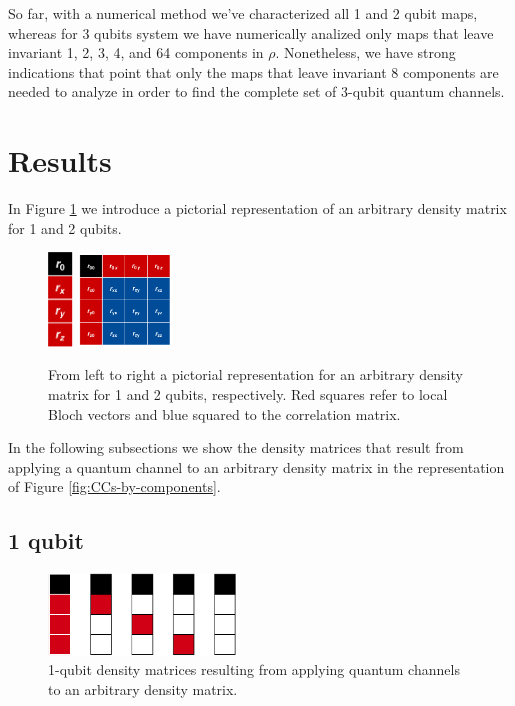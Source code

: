 \documentclass[11pt,dvipsnames]{article} %
\begin{document}
So far, with a numerical method we've characterized all 1 and 2 qubit maps, 
whereas for 3 qubits system we have numerically analized only maps that leave 
invariant 1, 2, 3, 4, and 64 components in $\rho$. Nonetheless, we have strong
indications that point that only the maps that leave invariant 8 components are 
needed to analyze in order to find the complete set of 3-qubit quantum 
channels.
\section*{Results} %
In Figure \ref{fig:pictorial-rep-rho} we introduce a pictorial representation 
of an arbitrary density matrix for 1 and 2 qubits.
\begin{figure} %
	\centering
	\hfill \hfill
	\includegraphics[height=2.5cm]
	{img/tablero-1q}
	\hfill
	\includegraphics[width=2.5cm]
	{img/rho2q(2)}
	\hfill \hfill
	\caption{From left to right a pictorial representation for an arbitrary
	density matrix for 1 and 2 qubits, respectively. Red squares refer to local
	Bloch vectors and blue squared to the correlation matrix.}
	\label{fig:pictorial-rep-rho}
\end{figure} %
In the following subsections we show the density matrices that result from
applying a quantum channel to an arbitrary density matrix in the representation
of Figure \ref{fig:CCs-by-components}.

\subsection*{1 qubit} %
\begin{figure}%
	\centering
	\includegraphics[width=5cm]
	{img/1q-CCs.png}
	\caption{ 1-qubit density
matrices resulting from applying quantum channels
	to an arbitrary density matrix.}
\end{figure} %
\end{document}
